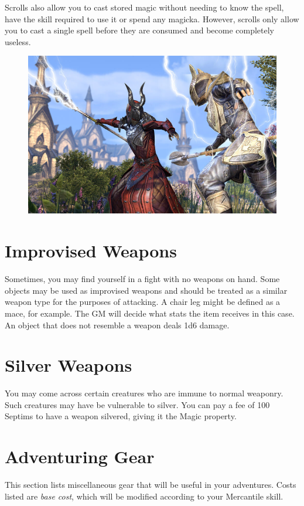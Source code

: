 \documentclass[12pt]{book}
\begin{document}
Scrolls also allow you to cast stored magic without needing to know the spell, have the skill required to use it or spend any magicka. However, scrolls only allow you to cast a single spell before they are consumed and become completely useless.

\begin{figure}
	\includegraphics[width=\textwidth]{staves.png}
\end{figure}

\section{Improvised Weapons}
Sometimes, you may find yourself in a fight with no weapons on hand. Some objects may be used as improvised weapons and should be treated as a similar weapon type for the purposes of attacking. A chair leg might be defined as a mace, for example. The GM will decide what stats the item receives in this case. An object that does not resemble a weapon deals 1d6 damage.

\section{Silver Weapons}
You may come across certain creatures who are immune to normal weaponry. Such creatures may have be vulnerable to silver. You can pay a fee of 100 Septims to have a weapon silvered, giving it the Magic property.

\section{Adventuring Gear}
This section lists miscellaneous gear that will be useful in your adventures. Costs listed are \textit{base cost}, which will be modified according to your Mercantile skill.
\end{document}
